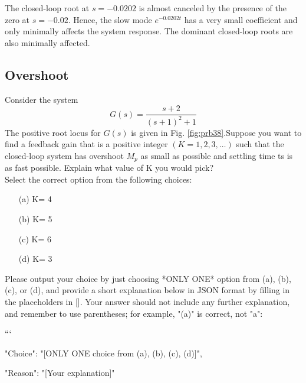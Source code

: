 \documentclass[12pt]{article}
\begin{document}
The closed-loop root at $s=-0.0202$ is almost canceled by the presence of the zero at $s=-0.02$. Hence, the slow mode $e^{-0.0202 t}$ has a very small coefficient and only minimally affects the system response. The dominant closed-loop roots are also minimally affected.
\clearpage

\subsection{Overshoot}

Consider the system 
\[
G(s)=\frac{s + 2}{(s+1)^2 +1}
\]
The positive root locus for $G(s)$ is given in Fig. \ref{fig:prb38}.Suppose you want to find a feedback gain that is a positive integer $(K = 1, 2, 3, \hdots )$ such that the
closed-loop system has overshoot $M_p$ as small as possible and settling time ts is as fast possible. Explain what value of K you would pick?\\
Select the correct option from the following choices:
\begin{enumerate}
    \item [(a)] K= 4
    \item [(b)] K= 5
    \item [(c)] K= 6
    \item [(d)] K= 3
\end{enumerate}

Please output your choice by just choosing *ONLY ONE* option from (a), (b), (c), or (d), and provide a short explanation below in JSON format by filling in the placeholders in []. Your answer should not include any further explanation, and remember to use parentheses; for example, "(a)" is correct, not "a": 

```
{

"Choice": "[ONLY ONE choice from (a), (b), (c), (d)]",

"Reason": "[Your explanation]"

}
\end{document}
